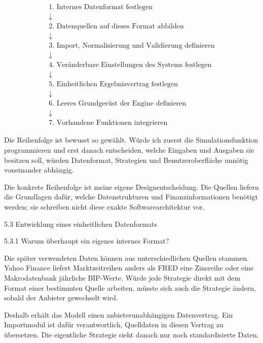 \documentclass[
  ngerman,
  a4paper,
  DIV=11,
  oneside]{scrreprt}
\begin{document}
\[
\begin{array}{c}
\boxed{\text{1. Internes Datenformat festlegen}}
\\[0.4cm]
\downarrow
\\[0.4cm]
\boxed{\text{2. Datenquellen auf dieses Format abbilden}}
\\[0.4cm]
\downarrow
\\[0.4cm]
\boxed{\text{3. Import, Normalisierung und Validierung definieren}}
\\[0.4cm]
\downarrow
\\[0.4cm]
\boxed{\text{4. Veränderbare Einstellungen des Systems festlegen}}
\\[0.4cm]
\downarrow
\\[0.4cm]
\boxed{\text{5. Einheitlichen Ergebnisvertrag festlegen}}
\\[0.4cm]
\downarrow
\\[0.4cm]
\boxed{\text{6. Leeres Grundgerüst der Engine definieren}}
\\[0.4cm]
\downarrow
\\[0.4cm]
\boxed{\text{7. Vorhandene Funktionen integrieren}}
\end{array}
\]

Die Reihenfolge ist bewusst so gewählt. Würde ich zuerst die
Simulationsfunktion programmieren und erst danach entscheiden, welche
Eingaben und Ausgaben sie besitzen soll, würden Datenformat, Strategien
und Benutzeroberfläche unnötig voneinander abhängig.

Die konkrete Reihenfolge ist meine eigene Designentscheidung. Die
Quellen liefern die Grundlagen dafür, welche Datenstrukturen und
Finanzinformationen benötigt werden; sie schreiben nicht diese exakte
Softwarearchitektur vor.

5.3 Entwicklung eines einheitlichen Datenformats

5.3.1 Warum überhaupt ein eigenes internes Format?

Die später verwendeten Daten können aus unterschiedlichen Quellen
stammen. Yahoo Finance liefert Marktzeitreihen anders als FRED eine
Zinsreihe oder eine Makrodatenbank jährliche BIP-Werte. Würde jede
Strategie direkt mit dem Format einer bestimmten Quelle arbeiten, müsste
sich auch die Strategie ändern, sobald der Anbieter gewechselt wird.

Deshalb erhält das Modell einen anbieterunabhängigen Datenvertrag. Ein
Importmodul ist dafür verantwortlich, Quelldaten in diesen Vertrag zu
übersetzen. Die eigentliche Strategie sieht danach nur noch
standardisierte Daten.
\end{document}
